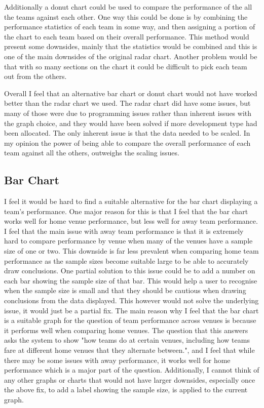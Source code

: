 \documentclass[10pt, journal]{IEEEtran}
\begin{document}
Additionally a donut chart could be used to compare the performance of the all the teams against each other. One way this could be done is by combining the performance statistics of each team in some way, and then assigning a portion of the chart to each team based on their overall performance. This method would present some downsides, mainly that the statistics would be combined and this is one of the main downsides of the original radar chart. Another problem would be that with so many sections on the chart it could be difficult to pick each team out from the others.

Overall I feel that an alternative bar chart or donut chart would not have worked better than the radar chart we used. The radar chart did have some issues, but many of those were due to programming issues rather than inherent issues with the graph choice, and they would have been solved if more development type had been allocated. The only inherent issue is that the data needed to be scaled. In my opinion the power of being able to compare the overall performance of each team against all the others, outweighs the scaling issues. 

\subsection{Bar Chart}
I feel it would be hard to find a suitable alternative for the bar chart displaying a team's performance. One major reason for this is that I feel that the bar chart works well for home venue performance, but less well for away team performance. I feel that the main issue with away team performance is that it is extremely hard to compare performance by venue when many of the venues have a sample size of one or two. This downside is far less prevalent when comparing home team performance as the sample sizes become suitable large to be able to accurately draw conclusions. One partial solution to this issue could be to add a number on each bar showing the sample size of that bar. This would help a user to recognise when the sample size is small and that they should be cautious when drawing conclusions from the data displayed. This however would not solve the underlying issue, it would just be a partial fix. The main reason why I feel that the bar chart is a suitable graph for the question of team performance across venues is because it performs well when comparing home venues. The question that this answers asks the system to show "how teams do at certain venues, including how teams fare at different home venues that they alternate between.", and I feel that while there may be some issues with away performance, it works well for home performance which is a major part of the question. Additionally, I cannot think of any other graphs or charts that would not have larger downsides, especially once the above fix, to add a label showing the sample size, is applied to the current graph.
\end{document}
